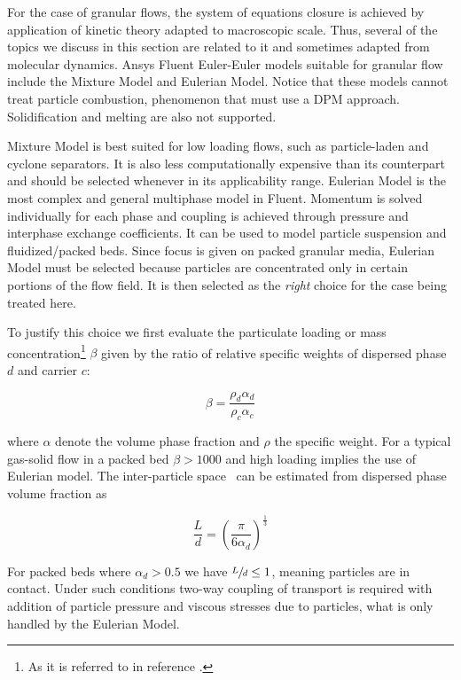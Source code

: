 For the case of granular flows, the system of equations closure is achieved by application of kinetic theory adapted to macroscopic scale. Thus, several of the topics we discuss in this section are related to it and sometimes adapted from molecular dynamics. Ansys Fluent Euler-Euler models suitable for granular flow include the Mixture Model and Eulerian Model. Notice that these models cannot treat particle combustion, phenomenon that must use a DPM approach. Solidification and melting are also not supported.

Mixture Model is best suited for low loading flows, such as particle-laden and cyclone separators. It is also less computationally expensive than its counterpart and should be selected whenever in its applicability range. Eulerian Model is the most complex and general multiphase model in Fluent. Momentum is solved individually for each phase and coupling is achieved through pressure and interphase exchange coefficients. It can be used to model particle suspension and fluidized/packed beds. Since focus is given on packed granular media, Eulerian Model must be selected because particles are concentrated only in certain portions of the flow field. It is then selected as the \emph{right} choice for the case being treated here.

To justify this choice we first evaluate the particulate loading or mass concentration\footnote{As it is referred to in reference \cite{Crowe2011}.} $\beta$ given by the ratio of relative specific weights of dispersed phase $d$ and carrier $c$:

\begin{equation}
\beta=\frac{\rho_{d}\alpha_{d}}{\rho_{c}\alpha_{c}}
\end{equation}

\noindent{}where $\alpha$ denote the volume phase fraction and $\rho$ the specific weight. For a typical gas-solid flow in a packed bed $\beta>1000$ and high loading implies the use of Eulerian model. The inter-particle space~\cite{Crowe2011} can be estimated from dispersed phase volume fraction as

\begin{equation}
\frac{L}{d}=\left(\frac{\pi}{6\alpha_{d}}\right)^{\frac{1}{3}}
\end{equation}

For packed beds where $\alpha_{d}>0.5$ we have $\sfrac{L}{d}\le{}1$, meaning particles are in contact. Under such conditions two-way coupling of transport is required with addition of particle pressure and viscous stresses due to particles, what is only handled by the Eulerian Model.

